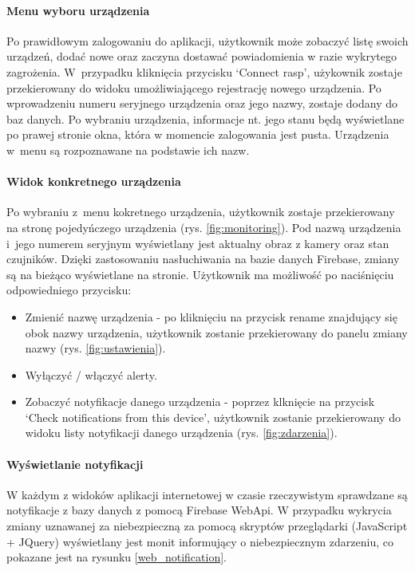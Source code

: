 \documentclass[polish,bachelor,a4paper,oneside]{ppfcmthesis}
\begin{document}
    \paragraph{Menu wyboru urządzenia} Po prawidłowym zalogowaniu do aplikacji, użytkownik może zobaczyć listę swoich urządzeń, dodać nowe oraz zaczyna dostawać powiadomienia w razie wykrytego zagrożenia. W~przypadku kliknięcia przycisku `Connect rasp', użykownik zostaje przekierowany do widoku umożliwiającego rejestrację nowego urządzenia. Po wprowadzeniu numeru seryjnego urządzenia oraz jego nazwy, zostaje dodany do baz danych. Po wybraniu urządzenia, informacje nt. jego stanu będą wyświetlane po prawej stronie okna, która w momencie zalogowania jest pusta. Urządzenia w~menu są rozpoznawane na podstawie ich nazw.

    \paragraph{Widok konkretnego urządzenia} Po wybraniu z~menu kokretnego urządzenia, użytkownik zostaje przekierowany na stronę pojedyńczego urządzenia (rys. \ref{fig:monitoring}). Pod nazwą urządzenia i~jego numerem seryjnym wyświetlany jest aktualny obraz z kamery oraz stan czujników. Dzięki zastosowaniu nasłuchiwania na bazie danych Firebase, zmiany są na bieżąco wyświetlane na stronie. Użytkownik ma możliwość po naciśnięciu odpowiedniego przycisku:
    \begin{itemize}
        \item Zmienić nazwę urządzenia - po kliknięciu na przycisk rename znajdujący się obok nazwy urządzenia, użytkownik zostanie przekierowany do panelu zmiany nazwy (rys. \ref{fig:ustawienia}).
        \item Wyłączyć / włączyć alerty.
        \item Zobaczyć notyfikacje danego urządzenia - poprzez klknięcie na przycisk `Check notifications from this device', użytkownik zostanie przekierowany do widoku listy notyfikacji danego urządzenia (rys. \ref{fig:zdarzenia}).
    \end{itemize}

    \paragraph{Wyświetlanie notyfikacji} W każdym z widoków aplikacji internetowej w czasie rzeczywistym sprawdzane są notyfikacje z bazy danych z pomocą Firebase WebApi. W przypadku wykrycia zmiany uznawanej za niebezpieczną za pomocą skryptów przeglądarki (JavaScript + JQuery) wyświetlany jest monit informujący o niebezpiecznym zdarzeniu, co pokazane jest na rysunku \ref{web_notification}.
\end{document}
